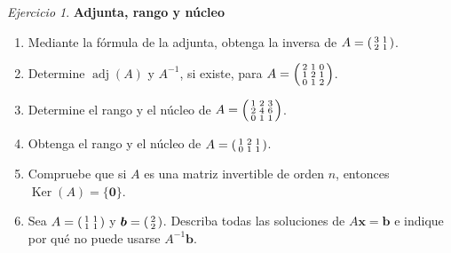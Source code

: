\documentclass[12pt]{article}
\theoremstyle{remark}
\newtheorem{Ejer}[definicion]{Ejercicio}
\newcommand{\adj}{\operatorname{adj}}
\newcommand{\Ker}{\operatorname{Ker}}
\newcommand{\vect}[1]{\boldsymbol{#1}}
\begin{document}
\begin{Ejer}
\textbf{Adjunta, rango y núcleo}
\begin{enumerate}[start=24]
\item Mediante la fórmula de la adjunta, obtenga la inversa de $A=\begin{psmallmatrix}3&1\\2&1\end{psmallmatrix}$.
\item Determine $\adj(A)$ y $A^{-1}$, si existe, para $A=\begin{psmallmatrix}2&1&0\\1&2&1\\0&1&2\end{psmallmatrix}$.
\item Determine el rango y el núcleo de $A=\begin{psmallmatrix}1&2&3\\2&4&6\\0&1&1\end{psmallmatrix}$.
\item Obtenga el rango y el núcleo de $A=\begin{psmallmatrix}1&2&1\\0&1&1\end{psmallmatrix}$.
\item Compruebe que si $A$ es una matriz invertible de orden $n$, entonces $\Ker(A)=\{\vect0\}$.
\item Sea $A=\begin{psmallmatrix}1&1\\1&1\end{psmallmatrix}$ y $\vect b=\begin{psmallmatrix}2\\2\end{psmallmatrix}$. Describa todas las soluciones de $A\vect{x}=\vect b$ e indique por qué no puede usarse $A^{-1}\vect b$.
\end{enumerate}
\end{Ejer}
\end{document}
